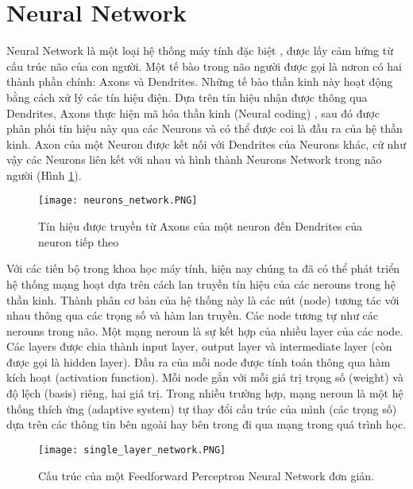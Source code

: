 \section{Neural Network}

Neural Network là một loại hệ thống máy tính đặc biệt \cite{sampson1987parallel}, được lấy cảm hứng từ cấu trúc não của con người. Một tế bào trong não người được gọi là nơron có hai thành phần chính: Axons và Dendrites. Những tế bào thần kinh này hoạt động bằng cách xử lý các tín hiệu điện. Dựa trên tín hiệu nhận được thông qua Dendrites, Axons thực hiện mã hóa thần kinh (Neural coding) \cite{thorpe1990spike}, sau đó được phân phối tín hiệu này qua các Neurons và có thể được coi là đầu ra của hệ thần kinh. Axon của một Neuron được kết nối với Dendrites của Neurons khác, cứ như vậy các Neurons liên kết với nhau và hình thành Neurons Network trong não người (Hình \ref{fig:neuron}).

\begin{figure}[h!]
	\centering
	\captionsetup{width=0.7\textwidth}
	\texttt{[image: neurons\_network.PNG]}
	\caption{Tín hiệu được truyền từ Axons của một neuron đến Dendrites của neuron tiếp theo}
    \label{fig:neuron}
\end{figure}

Với các tiến bộ trong khoa học máy tính, hiện nay chúng ta đã có thể phát triển hệ thống mạng hoạt dựa trên cách lan truyền tín hiệu của các nerouns trong hệ thần kinh. Thành phân cơ bản của hệ thống này là các nút (node) tương tác với nhau thông qua các trọng số và hàm lan truyền. Các node tương tự như các nerouns trong não. Một mạng neroun là sự kết hợp của nhiều layer của các node. Các layers được chia thành input layer, output layer và intermediate layer (còn được gọi là hidden layer). Đầu ra của mỗi node được tính toán thông qua hàm kích hoạt (activation function). Mỗi node gắn với mỗi giá trị trọng số (weight) và độ lệch (basis) riêng, hai giá trị. Trong nhiều trường hợp, mạng neroun là một hệ thống thích ứng (adaptive system) tự thay đổi cấu trúc của mình (các trọng số) dựa trên các thông tin bên ngoài hay bên trong đi qua mạng trong quá trình học.

\begin{figure}[h!]
	\centering
	\captionsetup{width=0.7\textwidth}
	\texttt{[image: single\_layer\_network.PNG]}
	\caption{Cấu trúc của một Feedforward Perceptron Neural Network đơn giản.}
    \label{fig:simple_network}
\end{figure}

